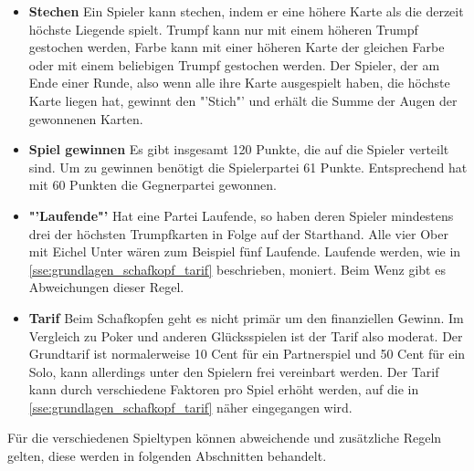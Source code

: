 \documentclass[
							a4paper, 
							11pt, 
							openany, 
							liststotoc,
							parskip=half, 
   							headings=normal
						]{scrreprt}
\begin{document}
{\begin{itemize}
Ist die Karte hingegen eine Farbkarte, muss die gleiche Farbe zugegeben werden, wenn der Spieler diese Farbe nicht frei ist. Hat er die Farbe nicht auf der Hand, kann er mit Trumpf "'stechen"', oder eine andere Farbkarte "'abspatzen"' oder "'schmieren"'.
Abspatzen nennt man das Abwerfen von Karten mit 0 Augen, schmieren nennt man das Zugeben von Karten mit vielen Augen.
	\item \textbf{Stechen}\newline
Ein Spieler kann stechen, indem er eine höhere Karte als die derzeit höchste Liegende spielt.\newline
Trumpf kann nur mit einem höheren Trumpf gestochen werden, Farbe kann mit einer höheren Karte der gleichen Farbe oder mit einem beliebigen Trumpf gestochen werden.\newline
Der Spieler, der am Ende einer Runde, also wenn alle ihre Karte ausgespielt haben, die höchste Karte liegen hat, gewinnt den "'Stich"' und erhält die Summe der Augen der gewonnenen Karten.
	\item \textbf{Spiel gewinnen}\newline
Es gibt insgesamt 120 Punkte, die auf die Spieler verteilt sind. Um zu gewinnen benötigt die Spielerpartei 61 Punkte. Entsprechend hat mit 60 Punkten die Gegnerpartei gewonnen.
	\item \textbf{"'Laufende"'}\newline
Hat eine Partei Laufende, so haben deren Spieler mindestens drei der höchsten Trumpfkarten in Folge auf der Starthand.
Alle vier Ober mit Eichel Unter wären zum Beispiel fünf Laufende.\newline
Laufende werden, wie in \autoref{sse:grundlagen_schafkopf_tarif} beschrieben, moniert.
Beim Wenz gibt es Abweichungen dieser Regel.
	\item \textbf{Tarif}\newline
Beim Schafkopfen geht es nicht primär um den finanziellen Gewinn. Im Vergleich zu Poker und anderen Glücksspielen ist der Tarif also moderat.
Der Grundtarif ist normalerweise 10 Cent für ein Partnerspiel und 50 Cent für ein Solo, kann allerdings unter den Spielern frei vereinbart werden. Der Tarif kann durch verschiedene Faktoren pro Spiel erhöht werden, auf die in \autoref{sse:grundlagen_schafkopf_tarif} näher eingegangen wird.
\end{itemize}\bigskip

Für die verschiedenen Spieltypen können abweichende und zusätzliche Regeln gelten,  diese werden in folgenden Abschnitten behandelt.

}
\end{document}
